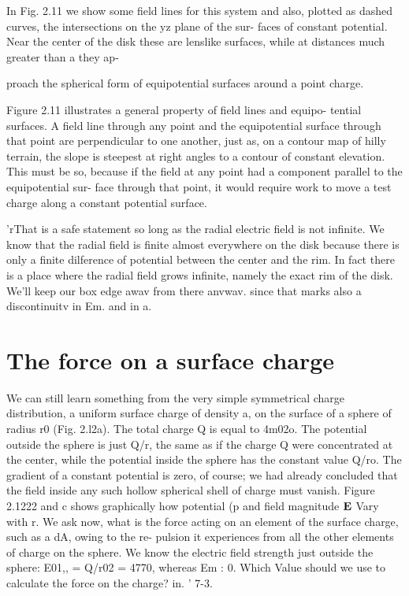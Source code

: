In Fig. 2.11 we show some field lines for this system and also,
plotted as dashed curves, the intersections on the yz plane of the sur-
faces of constant potential. Near the center of the disk these are
lenslike surfaces, while at distances much greater than a they ap-

proach the spherical form of equipotential surfaces around a point
charge.

Figure 2.11 illustrates a general property of field lines and equipo-
tential surfaces. A field line through any point and the equipotential
surface through that point are perpendicular to one another, just as,
on a contour map of hilly terrain, the slope is steepest at right angles
to a contour of constant elevation. This must be so, because if the
field at any point had a component parallel to the equipotential sur-
face through that point, it would require work to move a test charge
along a constant potential surface.

'rThat is a safe statement so long as the radial electric field is not infinite. We know
that the radial field is finite almost everywhere on the disk because there is only a finite
dilference of potential between the center and the rim. In fact there is a place where
the radial field grows infinite, namely the exact rim of the disk. We'll keep our box
edge awav from there anvwav. since that marks also a discontinuitv in Em. and in a.

\section{The force on a surface charge}

We can still learn something from the very simple symmetrical
charge distribution, a uniform surface charge of density a, on the
surface of a sphere of radius r0 (Fig. 2.l2a). The total charge Q is
equal to 4m02o. The potential outside the sphere is just Q/r, the
same as if the charge Q were concentrated at the center, while the
potential inside the sphere has the constant value Q/ro. The gradient
of a constant potential is zero, of course; we had already concluded
that the field inside any such hollow spherical shell of charge must
vanish. Figure 2.1222 and c shows graphically how potential (p and
field magnitude $\mathbf{E}$ Vary with r. We ask now, what is the force acting
on an element of the surface charge, such as a dA, owing to the re-
pulsion it experiences from all the other elements of charge on the
sphere. We know the electric field strength just outside the sphere:
E01,, = Q/r02 = 4770, whereas Em : 0. Which Value should we use
to calculate the force on the charge? in. ' 7-3.


